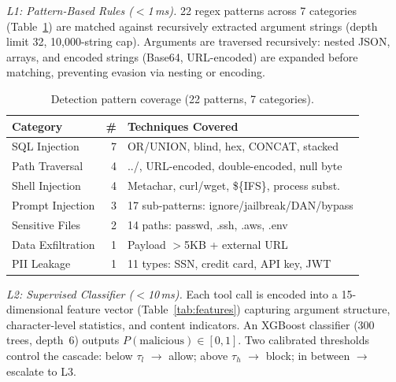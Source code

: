 \documentclass[sigconf]{acmart}
\begin{document}
\emph{L1: Pattern-Based Rules ($<$1\,ms).}
22 regex patterns across 7 categories (Table~\ref{tab:patterns}) are matched against recursively extracted argument strings (depth limit 32, 10{,}000-string cap).
Arguments are traversed recursively: nested JSON, arrays, and encoded strings (Base64, URL-encoded) are expanded before matching, preventing evasion via nesting or encoding.

\begin{table}[t]
\centering
\footnotesize
\caption{Detection pattern coverage (22 patterns, 7 categories).}
\vspace{-0.1in}
\label{tab:patterns}
\setlength{\tabcolsep}{2.5pt}
\begin{tabular}{lrl}
\toprule
\textbf{Category} & \textbf{\#} & \textbf{Techniques Covered} \\
\midrule
SQL Injection       & 7 & OR/UNION, blind, hex, CONCAT, stacked \\
Path Traversal      & 4 & ../, URL-encoded, double-encoded, null byte \\
Shell Injection     & 4 & Metachar, curl/wget, \$\{IFS\}, process subst. \\
Prompt Injection    & 3 & 17 sub-patterns: ignore/jailbreak/DAN/bypass \\
Sensitive Files     & 2 & 14 paths: passwd, .ssh, .aws, .env \\
Data Exfiltration   & 1 & Payload $>$5KB + external URL \\
PII Leakage         & 1 & 11 types: SSN, credit card, API key, JWT \\
\bottomrule
\end{tabular}
\vspace{-0.15in}
\end{table}

\emph{L2: Supervised Classifier ($<$10\,ms).}
Each tool call is encoded into a 15-dimensional feature vector (Table~\ref{tab:features}) capturing argument structure, character-level statistics, and content indicators. An XGBoost classifier (300 trees, depth~6) outputs $P(\text{malicious}) \in [0,1]$. Two calibrated thresholds control the cascade: below $\tau_l$ $\to$ allow; above $\tau_h$ $\to$ block; in between $\to$ escalate to L3.
\end{document}
